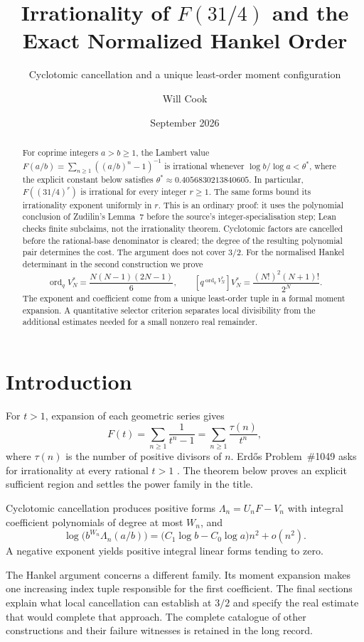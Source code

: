 \documentclass[11pt]{article}
\title{Irrationality of $F(31/4)$ and the\\Exact Normalized Hankel Order}
\subtitle{Cyclotomic cancellation and a unique least-order moment configuration}
\author{Will Cook}
\date{September 2026}
\begin{document}
\maketitle
\noteprovenance

\begin{abstract}
For coprime integers $a>b\ge1$, the Lambert value
$F(a/b)=\sum_{n\ge1}((a/b)^n-1)^{-1}$ is irrational whenever
$\log b/\log a<\theta^*$, where the explicit constant below satisfies
$\theta^*\approx0.4056830213840605$.
In particular, $F((31/4)^r)$ is irrational for every integer $r\ge1$.
The same forms bound its irrationality exponent uniformly in $r$.
This is an ordinary proof: it uses the polynomial conclusion of Zudilin's
Lemma~7 before the source's integer-specialisation step; Lean checks finite
subclaims, not the irrationality theorem.
Cyclotomic factors are cancelled before the rational-base denominator is
cleared; the degree of the resulting polynomial pair determines the cost.
The argument does not cover $3/2$.
For the normalised Hankel determinant in the second construction we prove
\[
 \operatorname{ord}_qV_N^*=\frac{N(N-1)(2N-1)}6,
 \qquad [q^{\operatorname{ord}_qV_N^*}]V_N^*
       =\frac{(N!)^2(N+1)!}{2^N}.
\]
The exponent and coefficient come from a unique least-order tuple in a formal
moment expansion.  A quantitative selector criterion separates local
divisibility from the additional estimates needed for a small nonzero real
remainder.
\end{abstract}

\section{Introduction}\label{sec:problem}

For $t>1$, expansion of each geometric series gives
\[
 F(t)=\sum_{n\ge1}\frac1{t^n-1}
     =\sum_{n\ge1}\frac{\tau(n)}{t^n},
\]
where $\tau(n)$ is the number of positive divisors of $n$.
Erd\H{o}s Problem~\#1049 asks for irrationality at every rational $t>1$
\cite[p.~102]{erdos1988}.  The theorem below proves an explicit sufficient
region and settles the power family in the title.

Cyclotomic cancellation produces positive forms $\Lambda_n=U_nF-V_n$
with integral coefficient polynomials of degree at most $W_n$, and
\[
 \log\!\bigl(b^{W_n}\Lambda_n(a/b)\bigr)
 =\bigl(C_1\log b-C_0\log a\bigr)n^2+o(n^2).
\]
A negative exponent yields positive integral linear forms tending to zero.

The Hankel argument concerns a different family.  Its moment expansion makes
one increasing index tuple responsible for the first coefficient.  The final
sections explain what local cancellation can establish at $3/2$ and specify
the real estimate that would complete that approach.  The complete catalogue
of other constructions and their failure witnesses is retained in the long
record.
\end{document}
